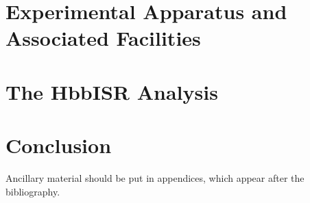 \documentclass[11pt]{ucthesis}
\begin{document}



\part{Experimental Apparatus and Associated Facilities}




\part{The HbbISR Analysis}
\label{part:HbbISR}









\part{Conclusion}


\printbibliography

\appendix



Ancillary material should be put in appendices, which appear after the
bibliography. 
\end{document}
